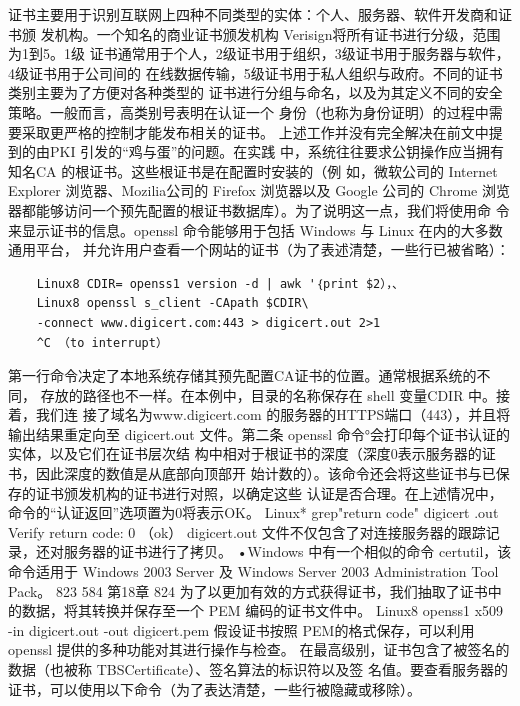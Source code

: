证书主要用于识别互联网上四种不同类型的实体：个人、服务器、软件开发商和证书颁
发机构。一个知名的商业证书颁发机构 Verisign将所有证书进行分级，范围为1到5。1级
证书通常用于个人，2级证书用于组织，3级证书用于服务器与软件，4级证书用于公司间的
在线数据传输，5级证书用于私人组织与政府。不同的证书类别主要为了方便对各种类型的
证书进行分组与命名，以及为其定义不同的安全策略。一般而言，高类别号表明在认证一个
身份（也称为身份证明）的过程中需要采取更严格的控制才能发布相关的证书。
上述工作并没有完全解决在前文中提到的由PKI 引发的“鸡与蛋”的问题。在实践
中，系统往往要求公钥操作应当拥有知名CA 的根证书。这些根证书是在配置时安装的（例
如，微软公司的 Internet Explorer 浏览器、Mozilia公司的 Firefox 浏览器以及 Google 公司的
Chrome 浏览器都能够访问一个预先配置的根证书数据库）。为了说明这一点，我们将使用命
令来显示证书的信息。openssl 命令能够用于包括 Windows 与 Linux 在内的大多数通用平台，
并允许用户查看一个网站的证书（为了表述清楚，一些行已被省略）：
\begin{verbatim}
    Linux8 CDIR= openss1 version -d | awk '｛print $2），、
    Linux8 openssl s_client -CApath $CDIR\
    -connect www.digicert.com:443 > digicert.out 2>1
    ^C （to interrupt）
\end{verbatim}
第一行命令决定了本地系统存储其预先配置CA证书的位置。通常根据系统的不同，
存放的路径也不一样。在本例中，目录的名称保存在 shell 变量CDIR 中。接着，我们连
接了域名为www.digicert.com 的服务器的HTTPS端口（443），并且将输出结果重定向至
digicert.out 文件。第二条 openssl 命令°会打印每个证书认证的实体，以及它们在证书层次结
构中相对于根证书的深度（深度0表示服务器的证书，因此深度的数值是从底部向顶部开
始计数的）。该命令还会将这些证书与已保存的证书颁发机构的证书进行对照，以确定这些
认证是否合理。在上述情况中，命令的“认证返回”选项置为0将表示OK。
Linux* grep"return code" digicert .out
Verify return code: 0 （ok）
digicert.out 文件不仅包含了对连接服务器的跟踪记录，还对服务器的证书进行了拷贝。
•Windows 中有一个相似的命令 certutil，该命令适用于 Windows 2003 Server 及 Windows Server 2003
Administration Tool Pack。
823
584
第18章
824
为了以更加有效的方式获得证书，我们抽取了证书中的数据，将其转换并保存至一个 PEM
编码的证书文件中。
Linux8 openss1 x509 -in digicert.out -out digicert.pem
假设证书按照 PEM的格式保存，可以利用openssl 提供的多种功能对其进行操作与检查。
在最高级别，证书包含了被签名的数据（也被称 TBSCertificate）、签名算法的标识符以及签
名值。要查看服务器的证书，可以使用以下命令（为了表达清楚，一些行被隐藏或移除）。
